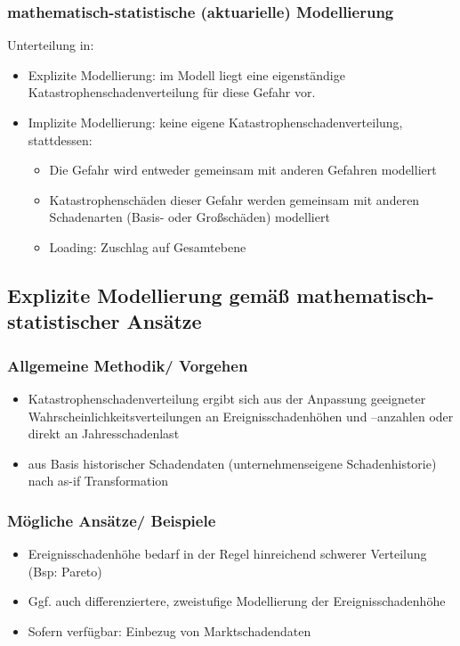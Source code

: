 \documentclass[12pt]{report}
\theoremstyle{dotless}
\theoremstyle{definition}
\begin{document}
\subsubsection{mathematisch-statistische (aktuarielle) Modellierung}
Unterteilung in:
\begin{itemize}
\item Explizite Modellierung: im Modell liegt eine eigenständige Katastrophenschadenverteilung für diese Gefahr vor.
\item Implizite Modellierung: keine eigene Katastrophenschadenverteilung, stattdessen: 
\begin{itemize}
\item Die Gefahr wird entweder gemeinsam mit anderen Gefahren modelliert
\item Katastrophenschäden dieser Gefahr werden gemeinsam mit anderen Schadenarten (Basis- oder Großschäden) modelliert
\item Loading: Zuschlag auf Gesamtebene
\end{itemize}
\end{itemize}


\subsection{Explizite Modellierung gemäß mathematisch-statistischer Ansätze}

\subsubsection{Allgemeine Methodik/ Vorgehen}
\begin{itemize}
\item Katastrophenschadenverteilung ergibt sich aus der Anpassung geeigneter Wahrscheinlichkeitsverteilungen an Ereignisschadenhöhen und –anzahlen oder direkt an Jahresschadenlast
\item aus Basis historischer Schadendaten (unternehmenseigene Schadenhistorie) nach as-if Transformation
\end{itemize}

\subsubsection{Mögliche Ansätze/ Beispiele}
\begin{itemize}
\item Ereignisschadenhöhe bedarf in der Regel hinreichend schwerer Verteilung (Bsp: Pareto)
\item Ggf. auch differenziertere, zweistufige Modellierung der Ereignisschadenhöhe
\item Sofern verfügbar: Einbezug von Marktschadendaten
\end{itemize}
\end{document}
